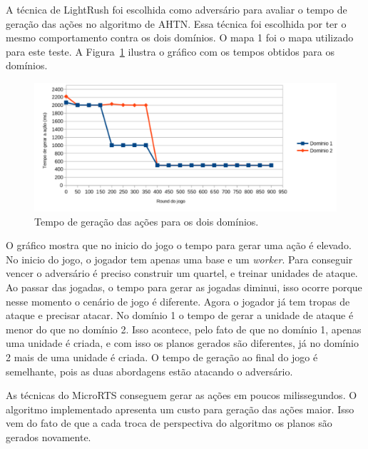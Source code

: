 A técnica de LightRush foi escolhida como adversário para avaliar o tempo de geração das ações no algoritmo de AHTN.
Essa técnica foi escolhida por ter o mesmo comportamento contra os dois domínios.
O mapa 1 foi o mapa utilizado para este teste.
A Figura~\ref{fig:tempo} ilustra o gráfico com os tempos obtidos para os domínios.

\begin{figure}[ht]
	\centering
	\includegraphics[width=.9\textwidth]{fig/graph.pdf}
	\caption{Tempo de geração das ações para os dois domínios.}
	\label{fig:tempo}
\end{figure}

O gráfico mostra que no inicio do jogo o tempo para gerar uma ação é elevado.
No inicio do jogo, o jogador tem apenas uma base e um \textit{worker}.
Para conseguir vencer o adversário é preciso construir um quartel, e treinar unidades de ataque.
Ao passar das jogadas, o tempo para gerar as jogadas diminui, isso ocorre porque nesse momento o cenário de jogo é diferente.
Agora o jogador já tem tropas de ataque e precisar atacar.
No domínio 1 o tempo de gerar a unidade de ataque é menor do que no domínio 2.
Isso acontece, pelo fato de que no domínio 1, apenas uma unidade é criada, e com isso os planos gerados são diferentes, já no domínio 2 mais de uma unidade é criada.
O tempo de geração ao final do jogo é semelhante, pois as duas abordagens estão atacando o adversário.

As técnicas do MicroRTS conseguem gerar as ações em poucos milissegundos.
O algoritmo implementado apresenta um custo para geração das ações maior.
Isso vem do fato de que a cada troca de perspectiva do algoritmo os planos são gerados novamente.


